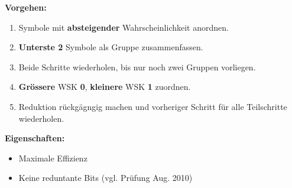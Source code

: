 \begin{multicols}{2}
  
  \columnbreak
  
  	\textbf{Vorgehen:}
  	\begin{enumerate}
	  \item Symbole mit \textbf{absteigender} Wahrscheinlichkeit anordnen.
	  \item \textbf{Unterste 2} Symbole als Gruppe zusammenfassen.
	  \item Beide Schritte wiederholen, bis nur noch zwei Gruppen vorliegen.
	  \item \textbf{Grössere} WSK \textbf{0}, \textbf{kleinere} WSK \textbf{1} zuordnen.
	  \item Reduktion rückgägngig machen und vorheriger Schritt für alle Teilschritte wiederholen.
	\end{enumerate}	
	
	\textbf{Eigenschaften:}
	\begin{itemize}
	  \item Maximale Effizienz
	  \item Keine reduntante Bits (vgl. Prüfung Aug. 2010)
	\end{itemize}
\end{multicols}
